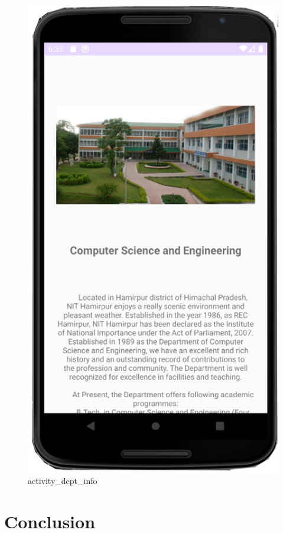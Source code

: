 \documentclass[11pt,a4paper]{report}
\begin{document}
\begin{figure}[H]
\begin{minipage}[b]{0.3\textwidth}
      \includegraphics[width=\textwidth]{./img/PREVIEW2.png}
      \caption{activity\_dept\_info}
    \end{minipage}
  \end{figure}


\chapter{Conclusion}
\end{document}
